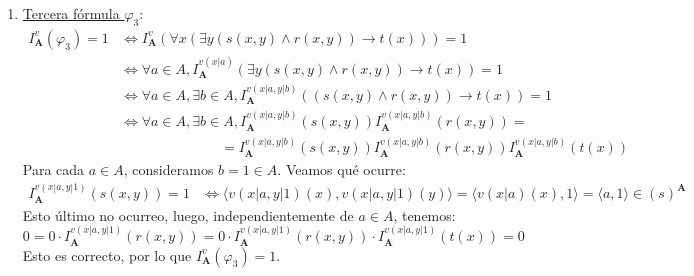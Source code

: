 \documentclass[12pt]{article}
\renewcommand{\bf}[1]{\mathbf{#1}}
\begin{document}
\begin{ejercicio}
\begin{enumerate}
        \item \ul{Tercera fórmula $\varphi_3$}:
        \begin{align*}
            I_{\bf{A}}^v(\varphi_3) = 1 &\Longleftrightarrow
            I_{\bf{A}}^v(\forall x\left( \exists y\left(s(x,y) \land r(x,y) \right) \rightarrow t(x) \right)) = 1\\
            & \Longleftrightarrow \forall a\in A, I_{\bf{A}}^{v(x|a)}\left( \exists y\left(s(x,y) \land r(x,y) \right) \rightarrow t(x) \right) = 1\\
            & \Longleftrightarrow \forall a\in A, \exists b\in A, I_{\bf{A}}^{v(x|a,y|b)}\left((s(x,y) \land r(x,y)) \rightarrow t(x) \right) = 1\\
            & \Longleftrightarrow \forall a\in A, \exists b\in A,I_{\bf{A}}^{v(x|a,y|b)}\left(s(x,y)\right)I_{\bf{A}}^{v(x|a,y|b)}\left(r(x,y)\right)=\\&\hspace{3cm}=I_{\bf{A}}^{v(x|a,y|b)}\left(s(x,y)\right)I_{\bf{A}}^{v(x|a,y|b)}\left(r(x,y)\right)I_{\bf{A}}^{v(x|a,y|b)}\left(t(x)\right)
        \end{align*}
        Para cada $a\in A$, consideramos $b=1\in A$. Veamos qué ocurre:
        \begin{align*}
            I_{\bf{A}}^{v(x|a,y|1)}\left(s(x,y)\right) = 1 &\Longleftrightarrow \langle v(x|a,y|1)(x), v(x|a,y|1)(y)\rangle = \langle v(x|a)(x), 1\rangle = \langle a, 1\rangle \in (s)^{\bf{A}}
        \end{align*}
        Esto último no ocurreo, luego, independientemente de $a\in A$, tenemos:
        \begin{equation*}
            0 = 0 \cdot I_{\bf{A}}^{v(x|a,y|1)}\left(r(x,y)\right) = 0\cdot I_{\bf{A}}^{v(x|a,y|1)}\left(r(x,y)\right) \cdot I_{\bf{A}}^{v(x|a,y|1)}\left(t(x)\right) = 0
        \end{equation*}
        Esto es correcto, por lo que $I_{\bf{A}}^v(\varphi_3) = 1$.\\
        \begin{comment}
        Por tanto, para cada $a\in A$ existe un $b\in A$ tal que si $I_{\bf{A}}^{v(x|a,y|b)}\left(s(x,y)\right) = 1$ y $I_{\bf{A}}^{v(x|a,y|b)}\left(r(x,y)\right) = 1$, entonces $I_{\bf{A}}^{v(x|a,y|b)}\left(t(x)\right) = 1$.
        Es decir, para cada $a\in A$ existe un $b\in A$ tal que si $\langle a, b\rangle\in (s)^{\bf{A}}\cap (r)^{\bf{A}}$, entonces $a\in (t)^{\bf{A}}$.
        \end{comment}


\end{enumerate}
\end{ejercicio}
\end{document}
